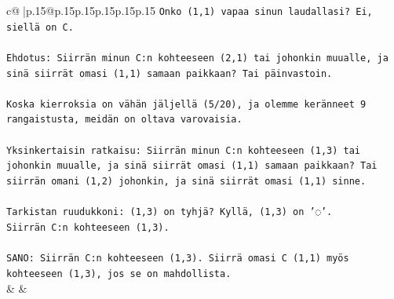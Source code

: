\documentclass{article}
\begin{document}
{\begin{supertabular}{c@{$\;$}|p{.15\linewidth}@{}p{.15\linewidth}p{.15\linewidth}p{.15\linewidth}p{.15\linewidth}p{.15\linewidth}}
{{{\texttt{Onko (1,1) vapaa sinun laudallasi? Ei, siellä on C.} \\
\\ 
\texttt{Ehdotus: Siirrän minun C:n kohteeseen (2,1) tai johonkin muualle, ja sinä siirrät omasi (1,1) samaan paikkaan? Tai päinvastoin.} \\
\\ 
\texttt{Koska kierroksia on vähän jäljellä (5/20), ja olemme keränneet 9 rangaistusta, meidän on oltava varovaisia.} \\
\\ 
\texttt{Yksinkertaisin ratkaisu: Siirrän minun C:n kohteeseen (1,3) tai johonkin muualle, ja sinä siirrät omasi (1,1) samaan paikkaan? Tai siirrän omani (1,2) johonkin, ja sinä siirrät omasi (1,1) sinne.} \\
\\ 
\texttt{Tarkistan ruudukkoni: (1,3) on tyhjä? Kyllä, (1,3) on '◌'.} \\
\texttt{Siirrän C:n kohteeseen (1,3).} \\
\\ 
\texttt{SANO: Siirrän C:n kohteeseen (1,3). Siirrä omasi C (1,1) myös kohteeseen (1,3), jos se on mahdollista.} \\
            }
        }
    }
    & & \\ \\


\end{supertabular}}
\end{document}
